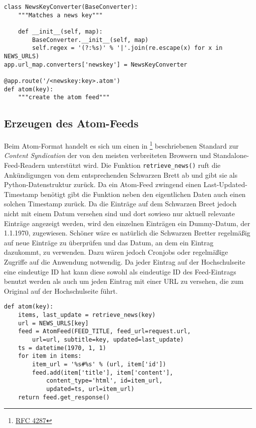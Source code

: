 \begin{lstlisting}[caption=HSKAtom - Routing,label=lst:hskatom-route-atom]
class NewsKeyConverter(BaseConverter):
    """Matches a news key"""

    def __init__(self, map):
        BaseConverter.__init__(self, map)
        self.regex = '(?:%s)' % '|'.join(re.escape(x) for x in NEWS_URLS)
app.url_map.converters['newskey'] = NewsKeyConverter

@app.route('/<newskey:key>.atom')
def atom(key):
    """create the atom feed"""
\end{lstlisting}

\subsection{Erzeugen des Atom-Feeds}

Beim Atom-Format handelt es sich um einen in \footnote{\href{http://www.ietf.org/rfc/rfc4287}{RFC
4287}} beschriebenen Standard zur \emph{Content Syndication} der von den meisten verbreiteten
Browsern und Standalone-Feed-Readern unterstützt wird. Die Funktion \lstinline{retrieve_news()} ruft
die Ankündigungen von dem entsprechenden Schwarzen Brett ab und gibt sie als Python-Datenstruktur
zurück. Da ein Atom-Feed zwingend einen Last-Updated-Timestamp benötigt gibt die Funktion neben den
eigentlichen Daten auch einen solchen Timestamp zurück. Da die Einträge auf dem Schwarzen Breet
jedoch nicht mit einem Datum versehen sind und dort sowieso nur aktuell relevante Einträge angezeigt
werden, wird den einzelnen Einträgen ein Dummy-Datum, der 1.1.1970, zugewiesen. Schöner wäre es
natürlich die Schwarzen Bretter regelmäßig auf neue Einträge zu überprüfen und das Datum, an dem ein
Eintrag dazukommt, zu verwenden. Dazu wären jedoch Cronjobs oder regelmäßige Zugriffe auf die
Anwendung notwendig. Da jeder Eintrag auf der Hochschulseite eine eindeutige ID hat kann diese
sowohl als eindeutige ID des Feed-Eintrags benutzt werden als auch um jeden Eintrag mit einer URL zu
versehen, die zum Original auf der Hochschulseite führt.

\begin{lstlisting}[caption=HSKAtom - Atom-Feed,label=lst:hskatom-atom]
def atom(key):
    items, last_update = retrieve_news(key)
    url = NEWS_URLS[key]
    feed = AtomFeed(FEED_TITLE, feed_url=request.url,
        url=url, subtitle=key, updated=last_update)
    ts = datetime(1970, 1, 1)
    for item in items:
        item_url = '%s#%s' % (url, item['id'])
        feed.add(item['title'], item['content'],
            content_type='html', id=item_url,
            updated=ts, url=item_url)
    return feed.get_response()
\end{lstlisting}


